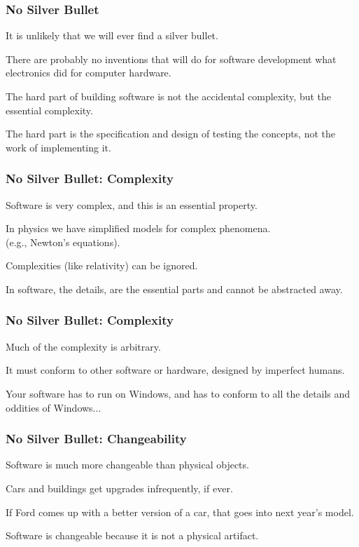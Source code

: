 \begin{frame}
\frametitle{No Silver Bullet}
\begin{changemargin}{1cm}
It is unlikely that we will ever find a silver bullet.

There are probably no inventions that will do for software development what electronics did for computer hardware. 

The hard part of building software is not the accidental complexity, but the essential complexity.

The hard part is the specification and design of testing the concepts, not the work of implementing it. 

\end{changemargin}
\end{frame}

\begin{frame}
\frametitle{No Silver Bullet: Complexity}
\begin{changemargin}{1cm}

Software is very complex, and this is an essential property. 

In physics we have simplified models for complex phenomena. \\
\quad (e.g., Newton's equations). 

Complexities (like relativity) can be ignored. 

In software, the details, are the essential parts and cannot be abstracted away. 
\end{changemargin}
\end{frame}

\begin{frame}
\frametitle{No Silver Bullet: Complexity}
\begin{changemargin}{1cm}
Much of the complexity is arbitrary. 

It must conform to other software or hardware, designed by imperfect humans. 

Your software has to run on Windows, and has to conform to all the details and oddities of Windows...

\end{changemargin}
\end{frame}

\begin{frame}
\frametitle{No Silver Bullet: Changeability}
\begin{changemargin}{1cm}
Software is much more changeable than physical objects. 

Cars and buildings get upgrades infrequently, if ever. 

If Ford comes up with a better version of a car, that goes into next year's model. 

Software is changeable because it is not a physical artifact. 

\end{changemargin}
\end{frame}

